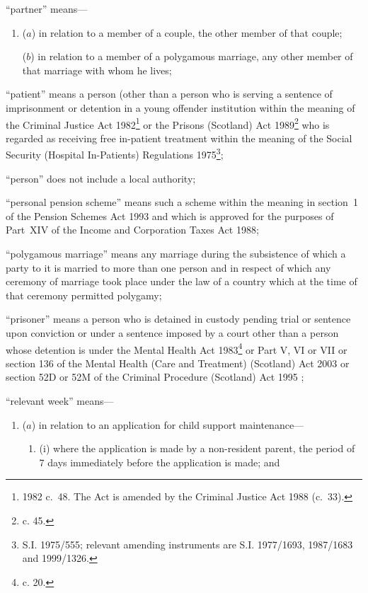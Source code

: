 \documentclass[12pt,a4paper]{article}
\begin{document}
\begin{enumerate}
“partner” means—
\begin{enumerate}\item[]
($a$) 
in relation to a member of a couple, the other member of that couple;

($b$) 
in relation to a member of a polygamous marriage, any other member of that marriage with whom he lives;
\end{enumerate}

“patient” means a person (other than a person who is serving a sentence of imprisonment or detention in a young offender institution within the meaning of the Criminal Justice Act 1982\footnote{1982 c.\ 48. The Act is amended by the Criminal Justice Act 1988 (c.~33).} or the Prisons (Scotland) Act 1989\footnote{ c. 45.} who is regarded as receiving free in-patient treatment within the meaning of the Social Security (Hospital In-Patients) Regulations 1975\footnote{\frenchspacing S.I. 1975/555; relevant amending instruments are S.I. 1977/1693, 1987/1683 and 1999/1326.};

“person” does not include a local authority;

“personal pension scheme” means such a scheme within the meaning in section~1 of the Pension Schemes Act 1993 and which is approved for the purposes of Part~XIV of the Income and Corporation Taxes Act 1988;

“polygamous marriage” means any marriage during the subsistence of which a party to it is married to more than one person and in respect of which any ceremony of marriage took place under the law of a country which at the time of that ceremony permitted polygamy;

“prisoner” means a person who is detained in custody pending trial or sentence upon conviction or under a sentence imposed by a court other than a person whose detention is under the Mental Health Act 1983\footnote{ c. 20.} or 
Part V, VI or VII or section 136 of the Mental Health (Care and Treatment) (Scotland) Act 2003 or section 52D or 52M of the Criminal Procedure (Scotland) Act 1995%
;

“relevant week” means—
\begin{enumerate}\item[]
($a$) 
in relation to an application for child support maintenance—
\begin{enumerate}\item[]
(i)
where the application is made by a non-resident parent, the period of 7 days immediately before the application is made; and


\end{enumerate}
\end{enumerate}
\end{enumerate}
\end{document}

